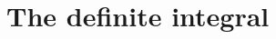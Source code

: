 \documentclass[../book/calcnotes.tex]{subfiles}
\begin{document}
\chapter{The definite integral}


\end{document}
